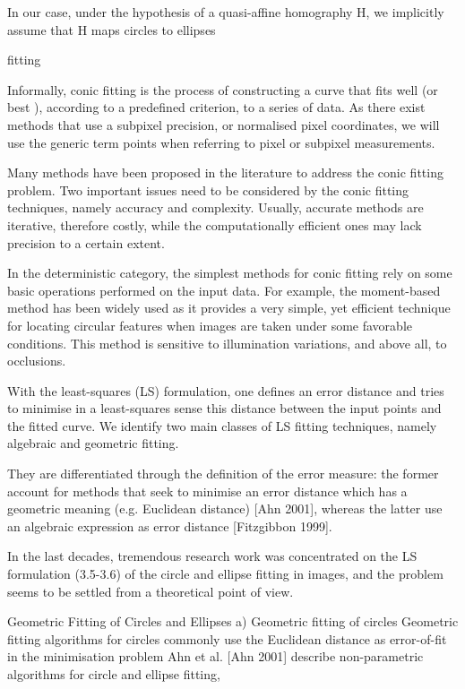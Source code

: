 \documentclass[a4paper]{report}
\begin{document}
In our case, under the hypothesis of a
quasi-affine homography H, we implicitly assume that H maps circles to ellipses


fitting

Informally, conic fitting is the process of constructing a curve that fits well (or best ), according
to a predefined criterion, to a series of data.
As there exist methods that
use a subpixel precision, or normalised pixel coordinates, we will use the generic term points
when referring to pixel or subpixel measurements.

Many methods have been proposed in the literature to address the conic fitting problem. Two
important issues need to be considered by the conic fitting techniques, namely accuracy and
complexity. Usually, accurate methods are iterative, therefore costly, while the computationally
efficient ones may lack precision to a certain extent.

In the deterministic category, the simplest methods for conic fitting rely on some
basic operations performed on the input data. For example, the moment-based method has
been widely used as it provides a very simple, yet efficient technique for locating circular features
when images are taken under some favorable conditions.
This method
is sensitive to illumination variations, and above all, to occlusions.

With the least-squares (LS) formulation, one defines an error distance and tries to minimise
in a least-squares sense this distance between the input points and the fitted curve. We identify
two main classes of LS fitting techniques, namely algebraic and geometric fitting.

They are
differentiated through the definition of the error measure: the former account for methods that
seek to minimise an error distance which has a geometric meaning (e.g. Euclidean distance)
[Ahn 2001], whereas the latter use an algebraic expression
as error distance [Fitzgibbon 1999].

In the last decades, tremendous research work was concentrated on the LS formulation (3.5-3.6)
of the circle and ellipse fitting in images, and the problem seems to be settled from a theoretical
point of view.

Geometric Fitting of Circles and Ellipses
a) Geometric fitting of circles
Geometric fitting algorithms for circles commonly use the Euclidean distance as error-of-fit
in the minimisation problem
Ahn et al. [Ahn 2001] describe non-parametric algorithms for circle and ellipse fitting,
\end{document}
